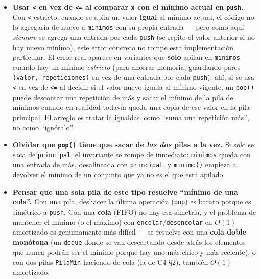 \documentclass[11pt]{article}
\begin{document}
\begin{alerta}{}
\begin{itemize}[leftmargin=14pt]
\item \textbf{Usar \texttt{<} en vez de \texttt{<=} al comparar \texttt{x} con el mínimo actual en
\texttt{push}.} Con \texttt{<} estricto, cuando se apila un valor \textbf{igual} al mínimo actual, el
código no lo agregaría de nuevo a \texttt{minimos} con su propia entrada --- pero como aquí \emph{siempre}
se agrega una entrada por cada \texttt{push} (se repite el valor anterior si no hay nuevo mínimo), este
error concreto no rompe esta implementación particular. El error real aparece en variantes que
\textbf{solo} apilan en \texttt{minimos} cuando hay un mínimo \emph{estricto} (para ahorrar memoria,
guardando pares \texttt{(valor, repeticiones)} en vez de una entrada por cada \texttt{push}): ahí, si se
usa \texttt{<} en vez de \texttt{<=} al decidir si el valor nuevo iguala al mínimo vigente, un
\texttt{pop()} puede descontar una repetición de más y sacar el mínimo de la pila de mínimos cuando en
realidad todavía queda una copia de ese valor en la pila principal. El arreglo es tratar la igualdad como
``suma una repetición más'', no como ``ignóralo''.
\item \textbf{Olvidar que \texttt{pop()} tiene que sacar de \emph{las dos} pilas a la vez.} Si solo se saca
de \texttt{principal}, el invariante se rompe de inmediato: \texttt{minimos} queda con una entrada de más,
desalineada con \texttt{principal}, y \texttt{minimo()} empieza a devolver el mínimo de un conjunto que ya
no es el que está apilado.
\item \textbf{Pensar que una sola pila de este tipo resuelve ``mínimo de una cola''.} Con una pila, deshacer la última operación
(\texttt{pop}) es barato porque es simétrico a \texttt{push}. Con una \textbf{cola} (FIFO) no hay esa
simetría, y el problema de mantener el mínimo (o el máximo) con \texttt{encolar}/\texttt{desencolar} en
$O(1)$ amortizado es genuinamente más difícil --- se resuelve con una \textbf{cola doble monótona} (un
\texttt{deque} donde se van descartando desde atrás los elementos que nunca podrán ser el mínimo porque hay
uno más chico y más reciente), o con dos pilas \texttt{PilaMin} haciendo de cola (la de C4 §2), también
$O(1)$ amortizado.
\end{itemize}
\end{alerta}
\end{document}
